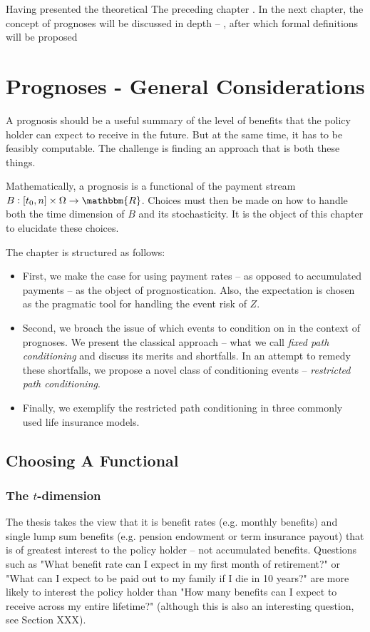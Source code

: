 \documentclass{article}
\newcommand{\1}[1]{\mathbbm{1}_{\left\lbrace #1 \right\rbrace}}
\theoremstyle{break}
\theoremstyle{remark}
\numberwithin{equation}{section}
\begin{document}
Having presented the theoretical The preceding chapter . In the next chapter, the concept of prognoses will be discussed in depth -- , after which formal definitions will be proposed

\newpage
\section{Prognoses - General Considerations}

A prognosis should be a useful summary of the level of benefits that the policy holder can expect to receive in the future. But at the same time, it has to be  feasibly computable. The challenge is finding an approach that is both these things.

Mathematically, a prognosis is a functional of the payment stream $B: [t_0,n] \times \Omega \to \mathbbm{R}$. Choices must then be made on how to handle both the time dimension of $B$ and its stochasticity. It is the object of this chapter to elucidate these choices.

The chapter is structured as follows:

\begin{itemize}
	\item First, we make the case for using payment rates -- as opposed to accumulated payments -- as the object of prognostication. Also, the expectation is chosen as the pragmatic tool for handling the event risk of $Z$.
	\item Second, we broach the issue of which events to condition on in the context of prognoses. We present the classical approach -- what we call \textit{fixed path conditioning} and discuss its merits and shortfalls. In an attempt to remedy these shortfalls, we propose a novel class of conditioning events -- \textit{restricted path conditioning}.
	\item Finally, we exemplify the restricted path conditioning in three commonly used life insurance models.
\end{itemize}

\subsection{Choosing A Functional}

\subsubsection{The $t$-dimension}

The thesis takes the view that it is benefit rates (e.g. monthly benefits) and single lump sum benefits (e.g. pension endowment or term insurance payout) that is of greatest interest to the policy holder -- not accumulated benefits. Questions such as "What benefit rate can I expect in my first month of retirement?" or "What can I expect to be paid out to my family if I die in 10 years?" are more likely to interest the policy holder than "How many benefits can I expect to receive across my entire lifetime?" (although this is also an interesting question, see Section XXX).
\end{document}
